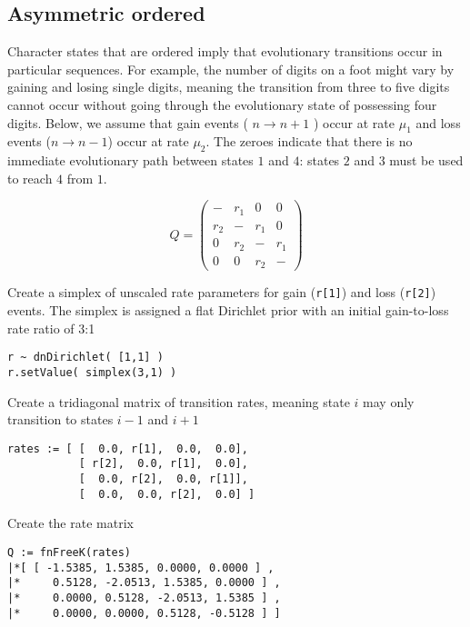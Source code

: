 \subsection{Asymmetric ordered}

Character states that are ordered imply that evolutionary transitions occur in particular sequences.
For example, the number of digits on a foot might vary by gaining and losing single digits, meaning the transition from three to five digits cannot occur without going through the evolutionary state of possessing four digits.
Below, we assume that gain events ( $n \rightarrow n+1$ ) occur at rate $\mu_1$ and loss events ($n \rightarrow n-1$) occur at rate $\mu_2$.
The zeroes indicate that there is no immediate evolutionary path between states $1$ and $4$: states $2$ and $3$ must be used to reach $4$ from $1$.

\begin{equation*}
Q = \begin{pmatrix}
- & r_1 & 0 & 0 \\
r_2 & -   & r_1 & 0 \\
0 & r_2 & -   & r_1 \\
0 & 0 & r_2 & - 
\end{pmatrix}
\end{equation*}


Create a simplex of unscaled rate parameters for gain ({\tt r[1]}) and loss ({\tt r[2]}) events.
The simplex is assigned a flat Dirichlet prior with an initial gain-to-loss rate ratio of 3:1

{\tt \begin{snugshade*}
\begin{lstlisting}
r ~ dnDirichlet( [1,1] )
r.setValue( simplex(3,1) )
\end{lstlisting}
\end{snugshade*}}

Create a tridiagonal matrix of transition rates, meaning state $i$ may only transition to states $i-1$ and $i+1$

{\tt \begin{snugshade*}
\begin{lstlisting}
rates := [ [  0.0, r[1],  0.0,  0.0],
           [ r[2],  0.0, r[1],  0.0],
           [  0.0, r[2],  0.0, r[1]],
           [  0.0,  0.0, r[2],  0.0] ]
\end{lstlisting}
\end{snugshade*}}

Create the rate matrix

{\tt \begin{snugshade*}
\begin{lstlisting}
Q := fnFreeK(rates)
|*[ [ -1.5385, 1.5385, 0.0000, 0.0000 ] ,
|*     0.5128, -2.0513, 1.5385, 0.0000 ] ,
|*     0.0000, 0.5128, -2.0513, 1.5385 ] ,
|*     0.0000, 0.0000, 0.5128, -0.5128 ] ]
\end{lstlisting}
\end{snugshade*}}

